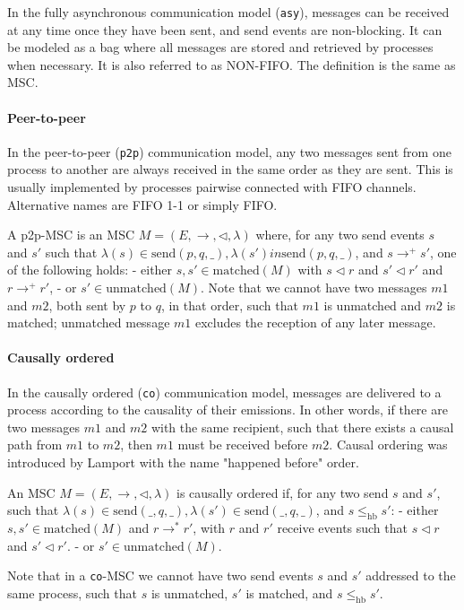 In the fully asynchronous communication model (\verb|asy|), messages can be received 
at any time once they have been sent, and send events are non-blocking. It can 
be modeled as a bag where all messages are stored and retrieved by processes 
when necessary. It is also referred to as NON-FIFO. The definition is the same 
as MSC.

\paragraph{Peer-to-peer} 
In the peer-to-peer (\verb|p2p|) communication model, any two messages sent from one 
process to another are always received in the same order as they are sent. This 
is usually implemented by processes pairwise connected with FIFO channels. 
Alternative names are FIFO 1-1 or simply FIFO.

A p2p-MSC is an MSC $M = (E,\to, \lhd, \lambda)$ where, for any two send events $s$ 
and $s'$ such that $\lambda(s) \in \text{send}(p, q, \_), \lambda(s') in \text{send}(p, q, \_)$, 
and $s \to^+ s'$, one of the following holds:
- either $s, s' \in \text{matched}(M)$ with $s \lhd r$ and $s' \lhd r'$ and 
$r \to^+ r'$,
- or $s' \in \text{unmatched}(M)$.
Note that we cannot have two messages $m 1$ and $m 2$, both sent by $p$ to $q$, 
in that order, such that $m 1$ is unmatched and $m 2$ is matched; unmatched 
message $m 1$ excludes the reception of any later message.

\paragraph{Causally ordered}
In the causally ordered (\verb|co|) communication model, messages are delivered to
a process according to the causality of their emissions. In other words, if there 
are two messages $m 1$ and $m 2$ with the same recipient, such that there exists 
a causal path from $m 1$ to $m 2$, then $m 1$ must be received before $m 2$. 
Causal ordering was introduced by Lamport with the name "happened before" order.

An MSC $M = (E, \to, \lhd, \lambda)$ is causally ordered if, for any two send $s$ and 
$s'$, such that $\lambda(s) \in \text{send}(\_, q, \_), \lambda(s') \in \text{send}(\_, q, \_)$, and 
$s \leq_{\text{hb}} s'$:
- either $s, s' \in \text{matched}(M)$ and $r \to^* r'$, with $r$ and $r'$ receive 
events such that $s \lhd r$ and $s' \lhd r'$.
- or $s' \in \text{unmatched}(M)$.

Note that in a \verb|co|-MSC we cannot have two send events $s$ and $s'$ addressed 
to the same process, such that $s$ is unmatched, $s'$ is matched, and 
$s \leq_{\text{hb}} s'$.

